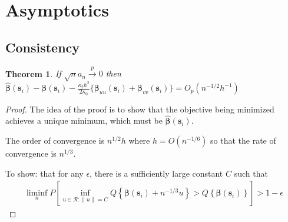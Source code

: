 \documentclass[authoryear, review, 11pt]{elsarticle}
\newtheorem{theorem}{Theorem}[section]
\begin{document}
  
\section{Asymptotics}
  \subsection{Consistency}
  \begin{theorem}\label{theorem:consistency}     
    If $\sqrt{n} a_n \xrightarrow{p} 0$ then $\hat{\bm{\beta}}(\bm{s}_i) - \bm{\beta}(\bm{s}_i) - \frac{\kappa_2 h^2}{2 \kappa_0} \{ \bm{\beta}_{uu}(\bm{s}_i) + \bm{\beta}_{vv}(\bm{s}_i) \} = O_p(n^{-1/2} h^{-1} )$
  \end{theorem}
  
  \begin{proof}
    The idea of the proof is to show that the objective being minimized achieves a unique minimum, which must be $\hat{\bm{\beta}}(\bm{s}_i)$.
    
    The order of convergence is $n^{1/2} h$ where $h = O(n^{-1/6})$ so that the rate of convergence is $n^{1/3}$.
    
    To show: that for any $\epsilon$, there is a sufficiently large constant $C$ such that
    \begin{align*}
      \liminf \limits_n P \left[ \inf_{u \in \mathcal{R}: \|u\| = C} Q \left\{ \bm{\beta}(\bm{s}_i) + n^{-1/3} u \right\} > Q \left\{ \bm{\beta}(\bm{s}_i) \right\} \right] > 1 - \epsilon
    \end{align*}
    

\end{proof}
\end{document}
